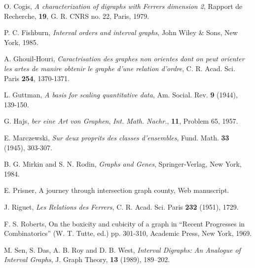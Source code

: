 \documentclass[11pt]{article}
\theoremstyle{definition}
\theoremstyle{remark}
\numberwithin{equation}{section}
\begin{document}
\vspace{2em}
\begin{thebibliography}{10}\label{bibliography}

O. Cogis, \emph{A characterization of digraphs with Ferrers dimension 2}, Rapport de Recherche, \textbf{19}, G. R. CNRS no. 22, Paris, 1979.

 P. C. Fishburn, \emph{Interval orders and interval graphs}, John Wiley \& Sons, New York, 1985.

A. Ghouil-Houri, \emph{Caractrisation des graphes non orientes dont on peut orienter les artes de manire  obtenir le graphe d'une relation d'ordre}, C. R. Acad. Sci. Paris \textbf{254}, 1370-1371.

L. Guttman, \emph{A basis for scaling quantitative data}, Am. Social. Rev. \textbf{9} (1944), 139-150.

G. Hajs, \emph{ber eine Art von Graphen}, \textit{Int. Math. Nachr.}, \textbf{11}, Problem 65, 1957.

E. Marczewski, \emph{Sur deux proprits des classes d'ensembles}, Fund. Math. \textbf{33} (1945), 303-307.

B. G. Mirkin and S. N. Rodin, \emph{Graphs and Genes}, Springer-Verlag, New York, 1984.

 E. Prisner, A journey  through intersection graph county, Web
manuscript.

J. Riguet, \emph{Les Relations des Ferrers}, C. R. Acad. Sci. Paris \textbf{232} (1951), 1729.

F. S. Roberts, On the boxicity and cubicity of a graph in ``Recent Progresses in Combinatorics'' (W. T. Tutte, ed.) pp. 301-310, Academic Press, New York, 1969.

M. Sen, S. Das, A. B. Roy and D. B. West, \emph{Interval Digraphs: An Analogue of Interval Graphs}, J. Graph Theory, \textbf{13} (1989), 189--202.

\end{thebibliography}
\end{document}
